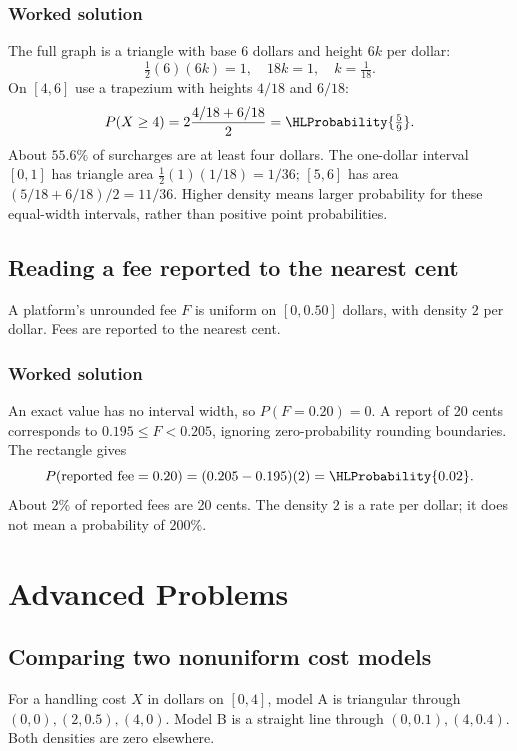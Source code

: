 \subsubsection*{Worked solution}\label{sol:sec:general-worked1}
The full graph is a triangle with base $6$ dollars and height $6k$ per dollar:
\[
\tfrac12(6)(6k)=1,\quad 18k=1,\quad k=\tfrac1{18}.
\]
On $[4,6]$ use a trapezium with heights $4/18$ and $6/18$:
\[
P(X\ge4)=2\frac{4/18+6/18}{2}=\HLProbability{\tfrac59}.
\]
About $55.6\%$ of surcharges are at least four dollars. The one-dollar interval $[0,1]$ has triangle area $\tfrac12(1)(1/18)=1/36$; $[5,6]$ has area $(5/18+6/18)/2=11/36$. Higher density means larger probability for these equal-width intervals, rather than positive point probabilities.


\subsection{Reading a fee reported to the nearest cent}\label{prob:sec:general-worked2}
A platform's unrounded fee $F$ is uniform on $[0,0.50]$ dollars, with density $2$ per dollar. Fees are reported to the nearest cent.
\subsubsection*{Worked solution}\label{sol:sec:general-worked2}
An exact value has no interval width, so $P(F=0.20)=0$. A report of 20 cents corresponds to $0.195\le F<0.205$, ignoring zero-probability rounding boundaries. The rectangle gives
\[
P(\text{reported fee}=0.20)=(0.205-0.195)(2)=\HLProbability{0.02}.
\]
About $2\%$ of reported fees are 20 cents. The density $2$ is a rate per dollar; it does not mean a probability of $200\%$.
\section{Advanced Problems}\label{sec:advanced}

\subsection{Comparing two nonuniform cost models}\label{prob:sec:advanced0}
For a handling cost $X$ in dollars on $[0,4]$, model A is triangular through $(0,0),(2,0.5),(4,0)$. Model B is a straight line through $(0,0.1),(4,0.4)$. Both densities are zero elsewhere.
